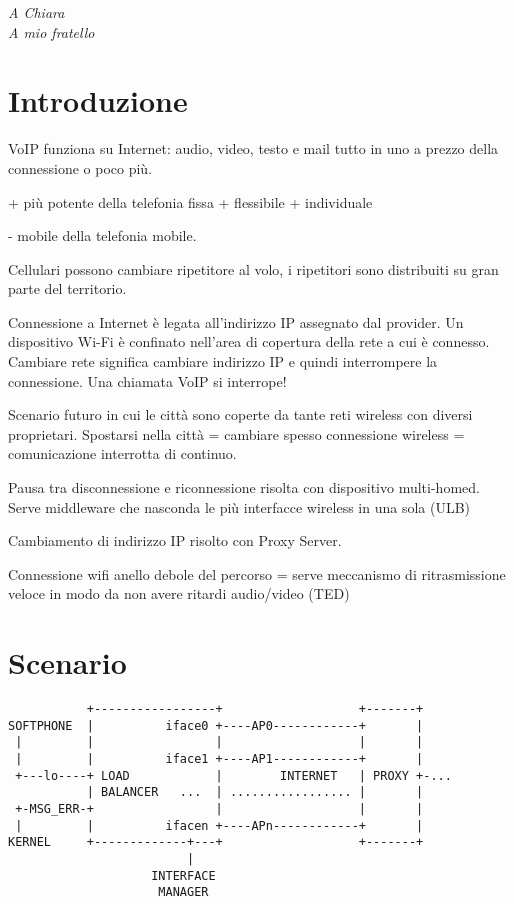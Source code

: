 \documentclass[12pt,a4paper,openright,twoside]{book}
\begin{document}
%
%
\begin{titlepage}
  \thispagestyle{empty}
  \topmargin=6.5cm
  \raggedleft
  \large
  \em
  A Chiara\\
  A mio fratello
\end{titlepage}


\chapter*{Introduzione}

VoIP funziona su Internet: audio, video, testo e mail tutto in uno a
prezzo della connessione o poco più.

+ più potente della telefonia fissa
+ flessibile
+ individuale

- mobile della telefonia mobile.

Cellulari possono cambiare ripetitore al volo, i ripetitori sono distribuiti
su gran parte del territorio.

Connessione a Internet è legata all'indirizzo IP assegnato dal provider.
Un dispositivo Wi-Fi è confinato nell'area di copertura della rete a cui è
connesso. Cambiare rete significa cambiare indirizzo IP e quindi
interrompere la connessione. Una chiamata VoIP si interrope!

Scenario futuro in cui le città sono coperte da tante reti wireless con
diversi proprietari. Spostarsi nella città = cambiare spesso connessione
wireless = comunicazione interrotta di continuo.

Pausa tra disconnessione e riconnessione risolta con dispositivo
multi-homed. Serve middleware che nasconda le più interfacce wireless in una
sola (ULB)

Cambiamento di indirizzo IP risolto con Proxy Server.

Connessione wifi anello debole del percorso = serve meccanismo di
ritrasmissione veloce in modo da non avere ritardi audio/video (TED)

\tableofcontents

\chapter{Scenario}

\begin{verbatim}
           +-----------------+                   +-------+
SOFTPHONE  |          iface0 +----AP0------------+       |
 |         |                 |                   |       |
 |         |          iface1 +----AP1------------+       |
 +---lo----+ LOAD            |        INTERNET   | PROXY +-...
           | BALANCER   ...  | ................. |       |
 +-MSG_ERR-+                 |                   |       |
 |         |          ifacen +----APn------------+       |
KERNEL     +-------------+---+                   +-------+
                         |
                    INTERFACE
                     MANAGER
\end{verbatim}
\end{document}
